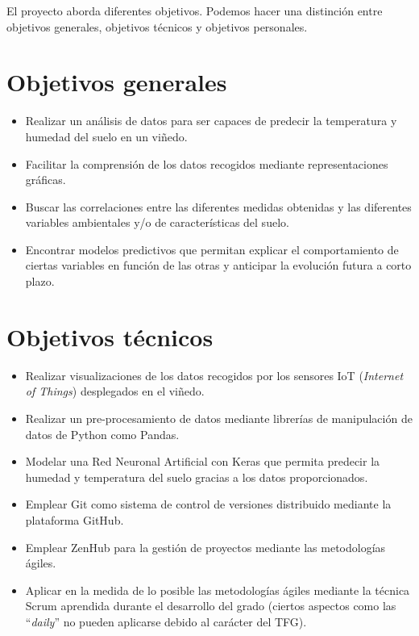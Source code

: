 
El proyecto aborda diferentes objetivos. Podemos hacer una distinción entre 
objetivos generales, objetivos técnicos y objetivos personales.

\section{Objetivos generales}
\begin{itemize}
    \item Realizar un análisis de datos para ser capaces de predecir la temperatura
        y humedad del suelo en un viñedo.
    \item Facilitar la comprensión de los datos recogidos mediante representaciones
        gráficas.
    \item Buscar las correlaciones entre las diferentes medidas obtenidas y las 
        diferentes variables ambientales y/o de características del suelo.
    \item Encontrar modelos predictivos que permitan explicar el comportamiento
        de ciertas variables en función de las otras y anticipar la evolución futura
        a corto plazo.
\end{itemize}

\section{Objetivos técnicos}
\begin{itemize}    
    \item Realizar visualizaciones de los datos recogidos por los sensores IoT 
        (\textit{Internet of Things}) desplegados en el viñedo.
    \item Realizar un pre-procesamiento de datos mediante librerías de manipulación
        de datos de Python como Pandas.
    \item Modelar una Red Neuronal Artificial con Keras que permita predecir la humedad
        y temperatura del suelo gracias a los datos proporcionados.
    \item Emplear Git como sistema de control de versiones distribuido mediante
        la plataforma GitHub.
    \item Emplear ZenHub para la gestión de proyectos mediante las metodologías 
        ágiles.
    \item Aplicar en la medida de lo posible las metodologías ágiles mediante la 
        técnica Scrum aprendida durante el desarrollo del grado (ciertos aspectos
        como las ``\textit{daily}'' no pueden aplicarse debido al carácter del TFG).
\end{itemize}

